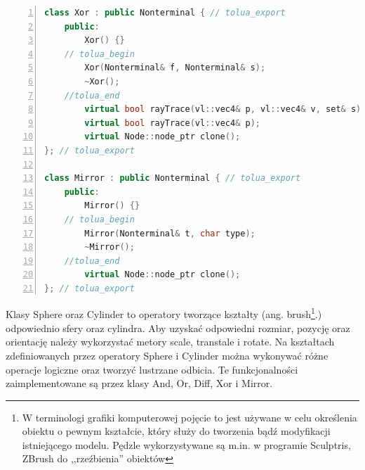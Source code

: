 {\begin{lstlisting}[language=C++,numbers=left,frame=single,numberstyle=\tiny,backgroundcolor=\color{code_back},breaklines=true]
class Xor : public Nonterminal { // tolua_export
    public:
        Xor() {}
    // tolua_begin
        Xor(Nonterminal& f, Nonterminal& s);
        ~Xor();
    //tolua_end
        virtual bool rayTrace(vl::vec4& p, vl::vec4& v, set& s);
        virtual bool rayTrace(vl::vec4& p);
        virtual Node::node_ptr clone();
}; // tolua_export

class Mirror : public Nonterminal { // tolua_export
    public:
        Mirror() {}
    // tolua_begin
        Mirror(Nonterminal& t, char type);
        ~Mirror();
    //tolua_end
        virtual Node::node_ptr clone();
}; // tolua_export
\end{lstlisting}
}

Klasy Sphere oraz Cylinder to operatory tworzące kształty (ang.
brush\footnote{W terminologi grafiki komputerowej pojęcie to jest używane w
celu określenia obiektu o pewnym kształcie, który służy do tworzenia bądź
modyfikacji istniejącego modelu. Pędzle wykorzystywane są m.in. w programie
Sculptris, ZBrush do ,,rzeźbienia'' obiektów}.) odpowiednio sfery oraz cylindra.
Aby uzyskać odpowiedni rozmiar, pozycję oraz orientację należy wykorzystać
metory scale, transtale i rotate.
Na kształtach zdefiniowanych przez operatory Sphere i Cylinder można wykonywać
różne operacje logiczne oraz tworzyć lustrzane odbicia. Te funkcjonalności
zaimplementowane są przez klasy And, Or, Diff, Xor i Mirror.
